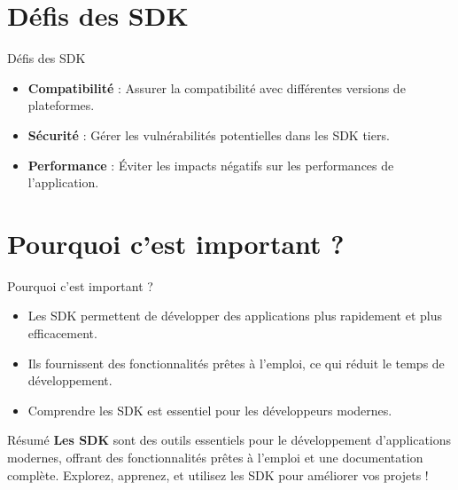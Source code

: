 \documentclass{clbeamer2024}
\begin{document}
	
	\section{Défis des SDK}
	\begin{frame}{Défis des SDK}
		\begin{itemize}
			\item \textbf{Compatibilité} : Assurer la compatibilité avec différentes versions de plateformes.
			\item \textbf{Sécurité} : Gérer les vulnérabilités potentielles dans les SDK tiers.
			\item \textbf{Performance} : Éviter les impacts négatifs sur les performances de l'application.
		\end{itemize}
	\end{frame}
	
	
	\section{Pourquoi c'est important ?}
	\begin{frame}{Pourquoi c'est important ?}
		\begin{itemize}
			\item Les SDK permettent de développer des applications plus rapidement et plus efficacement.
			\item Ils fournissent des fonctionnalités prêtes à l'emploi, ce qui réduit le temps de développement.
			\item Comprendre les SDK est essentiel pour les développeurs modernes.
		\end{itemize}
	\end{frame}
	
	
	\begin{frame}{Résumé}
		\textbf{Les SDK} sont des outils essentiels pour le développement d'applications modernes, offrant des fonctionnalités prêtes à l'emploi et une documentation complète.  
		Explorez, apprenez, et utilisez les SDK pour améliorer vos projets ! 
	\end{frame}

	

	
\end{document}

